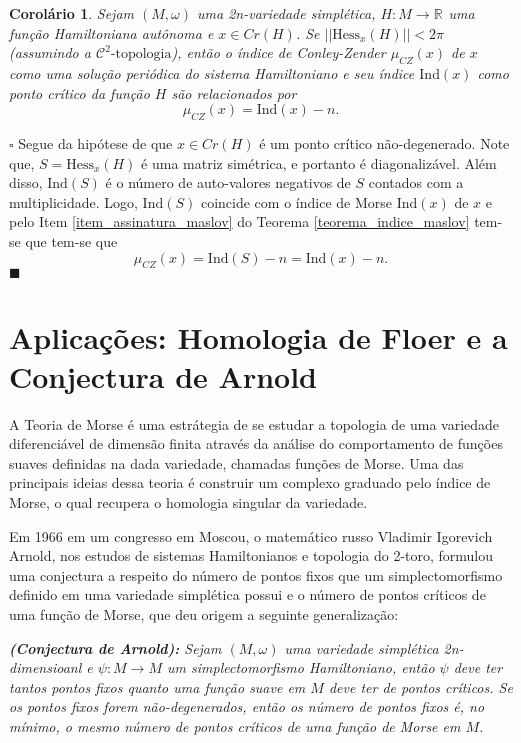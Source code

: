 \documentclass[12pt]{book}
\newtheorem{corolario}[teorema]{Corolário}
\newenvironment{prova}[1]{$\square$ #1}{\hfill$\blacksquare$}
\newcommand{\cktopologia}[1]{\mathcal{C}^{#1}\text{-topologia}}
\newcommand{\hessianaponto}[2]{\text{Hess}_{#1}(#2)}
\newcommand{\iconley}[1]{\iconleyabrev(#1)}
\newcommand{\iconleyabrev}{\mu_{CZ}}
\newcommand{\ind}{\text{Ind}}
\newcommand{\norma}[1]{||#1||}
\newcommand{\pontoscriticos}[1]{\textit{Cr}(#1)}
\newcommand{\real}[1]{\mathbb{R}^{#1}}
\newcommand{\reta}{\real{}}
\begin{document}
	
	\begin{corolario}
		Sejam $(M,\omega)$ uma 2n-variedade simplética, $H:M\to \reta$ uma função Hamiltoniana autônoma e $x \in \pontoscriticos{H}$. Se $\norma{\hessianaponto{x}{H}}<2\pi$ (assumindo a $\cktopologia{2}$), então o índice de Conley-Zender $\iconley{x}$ de $x$ como uma solução periódica do sistema Hamiltoniano e seu índice $\ind(x)$ como ponto crítico da função $H$ são relacionados por
		$$
		\iconley{x} = \ind(x)-n.
		$$
	\end{corolario}
	\begin{prova}
		Segue da hipótese de que $x\in \pontoscriticos{H}$ é um ponto crítico não-degenerado. Note que, $S=\hessianaponto{x}{H}$ é uma matriz simétrica, e portanto é diagonalizável. Além disso, $\ind(S)$ é o número de auto-valores negativos de $S$ contados com a multiplicidade. Logo, $\ind(S)$ coincide com o índice de Morse $\ind(x)$ de $x$ e pelo Item \ref{item_assinatura_maslov} do Teorema \ref{teorema_indice_maslov} tem-se que tem-se que
		$$
		\iconley{x} = \ind(S)-n = \ind(x)-n.
		$$
	\end{prova}
	
	\chapter{Aplicações: Homologia de Floer e a Conjectura de Arnold}\label{capitulo_aplicacoes}
	
	A Teoria de Morse é uma estrátegia de se estudar a topologia de uma variedade diferenciável de dimensão finita através da análise do comportamento de funções suaves definidas na dada variedade, chamadas funções de Morse. Uma das principais ideias dessa teoria é construir um complexo graduado pelo índice de Morse, o qual recupera o homologia singular da variedade.
	
	Em 1966 em um congresso em Moscou, o matemático russo Vladimir Igorevich Arnold, nos estudos de sistemas Hamiltonianos e topologia do 2-toro, formulou uma conjectura a respeito do número de pontos fixos que um simplectomorfismo definido em uma variedade simplética possui e o número de pontos críticos de uma função de Morse, que deu origem a seguinte generalização:
	
	\textit{\textbf{(Conjectura de Arnold):} Sejam $(M, \omega)$ uma variedade simplética 2n-dimensioanl e $\psi : M \to M $ um simplectomorfismo Hamiltoniano, então $\psi$ deve ter tantos pontos fixos quanto uma função suave em $M$ deve ter de pontos críticos. Se os pontos fixos forem não-degenerados, então os número de pontos fixos é, no mínimo, o mesmo número de pontos críticos de uma função de Morse em $M$.}
	
\end{document}

